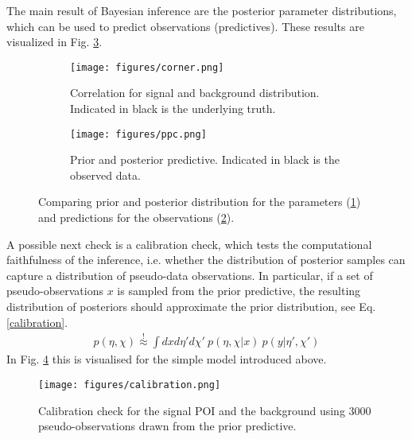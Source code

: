 \noindent The main result of Bayesian inference are the posterior parameter distributions, which can be used to predict observations (predictives). These results are visualized in Fig. \ref{ppc_corner}. 
    \begin{figure} %
        \centering
             \begin{subfigure}[b]{0.35\textwidth}
                 \centering
                 \texttt{[image: figures/corner.png]}
                 \caption{Correlation for signal and background distribution. Indicated in black is the underlying truth.}
                 \label{corner}
             \end{subfigure}
        \hspace{0.2\textwidth}
             \begin{subfigure}[b]{0.3\textwidth}
                 \centering
                 \texttt{[image: figures/ppc.png]}
                 \caption{Prior and posterior predictive. Indicated in black is the observed data.}
                 \label{ppc}
             \end{subfigure}
        \caption{Comparing prior and posterior distribution for the parameters (\ref{corner}) and predictions for the observations (\ref{ppc}).}
        \label{ppc_corner}
    \end{figure}
\noindent A possible next check is a calibration check, which tests the computational faithfulness of the inference, i.e. whether the distribution of posterior samples can capture a distribution of pseudo-data observations. In particular, if a set of pseudo-observations $x$ is sampled from the prior predictive, the resulting distribution of posteriors should approximate the prior distribution, see Eq.\ref{calibration}. 
    \begin{align} \label{calibration}
        p\left(\eta, \chi\right) \overset{!} \approx \int dxd\eta' d\chi' ~  p\left( \eta, \chi | x \right) ~ p\left(y|\eta', \chi'\right)  
    \end{align}
\noindent In Fig. \ref{calibrationPlot} this is visualised for the simple model introduced above. 
    \begin{figure} %
        \centering
        \texttt{[image: figures/calibration.png]}
        \centering
        \caption{Calibration check for the signal POI and the background using 3000 pseudo-observations drawn from the prior predictive.}
        \label{calibrationPlot}
    \end{figure} 